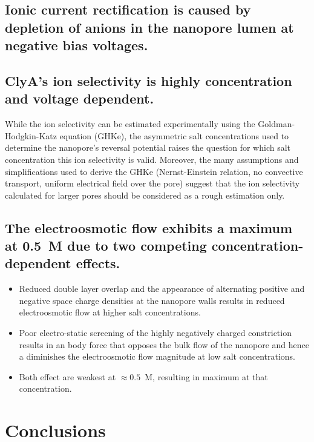 \documentclass[journal=ancac3,manuscript=article,etalmode=truncate,maxauthors=0,layout=onecolumn]{achemso}
\begin{document}
\subsection{Ionic current rectification is caused by depletion of anions in the nanopore lumen at negative
bias voltages.}

\subsection{ClyA's ion selectivity is highly concentration and voltage dependent.}

While the ion selectivity can be estimated experimentally using the Goldman-Hodgkin-Katz equation
(GHKe),\cite{Franceschini-2016,Huang-2017} the asymmetric salt concentrations used to determine the nanopore's
reversal potential raises the question for which salt concentration this ion selectivity is valid. Moreover,
the many assumptions and simplifications used to derive the GHKe (Nernst-Einstein relation, no convective
transport, uniform electrical field over the pore) suggest that the ion selectivity calculated for larger
pores should be considered as a rough estimation only.


\subsection{The electroosmotic flow exhibits a maximum at 0.5~M due to two
competing concentration-dependent effects.}

\begin{itemize}
  \item Reduced double layer overlap and the appearance of alternating positive and negative space charge
  densities at the nanopore walls results in reduced electroosmotic flow at higher salt concentrations.
  \item Poor electro-static screening of the highly negatively charged \trans{} constriction
  results in an body force that opposes the bulk flow of the nanopore and hence a diminishes the
  electroosmotic flow magnitude at low salt concentrations.
  \item Both effect are weakest at $\approx0.5$~M, resulting in maximum at that concentration.
\end{itemize}

\section{Conclusions}\label{sec:conclusions}
\end{document}
